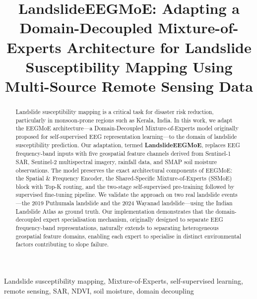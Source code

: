 \documentclass[conference]{IEEEtran}
\begin{document}
\title{LandslideEEGMoE: Adapting a Domain-Decoupled Mixture-of-Experts Architecture for Landslide Susceptibility Mapping Using Multi-Source Remote Sensing Data}

\author{
}

\maketitle

\begin{abstract}
Landslide susceptibility mapping is a critical task for disaster risk reduction, particularly in monsoon-prone regions such as Kerala, India. In this work, we adapt the EEGMoE architecture—a Domain-Decoupled Mixture-of-Experts model originally proposed for self-supervised EEG representation learning—to the domain of landslide susceptibility prediction. Our adaptation, termed \textbf{LandslideEEGMoE}, replaces EEG frequency-band inputs with five geospatial feature channels derived from Sentinel-1 SAR, Sentinel-2 multispectral imagery, rainfall data, and SMAP soil moisture observations. The model preserves the exact architectural components of EEGMoE: the Spatial \& Frequency Encoder, the Shared-Specific Mixture-of-Experts (SSMoE) block with Top-K routing, and the two-stage self-supervised pre-training followed by supervised fine-tuning pipeline. We validate the approach on two real landslide events—the 2019 Puthumala landslide and the 2024 Wayanad landslide—using the Indian Landslide Atlas as ground truth. Our implementation demonstrates that the domain-decoupled expert specialisation mechanism, originally designed to separate EEG frequency-band representations, naturally extends to separating heterogeneous geospatial feature domains, enabling each expert to specialise in distinct environmental factors contributing to slope failure.
\end{abstract}

\begin{IEEEkeywords}
Landslide susceptibility mapping, Mixture-of-Experts, self-supervised learning, remote sensing, SAR, NDVI, soil moisture, domain decoupling
\end{IEEEkeywords}
\end{document}
